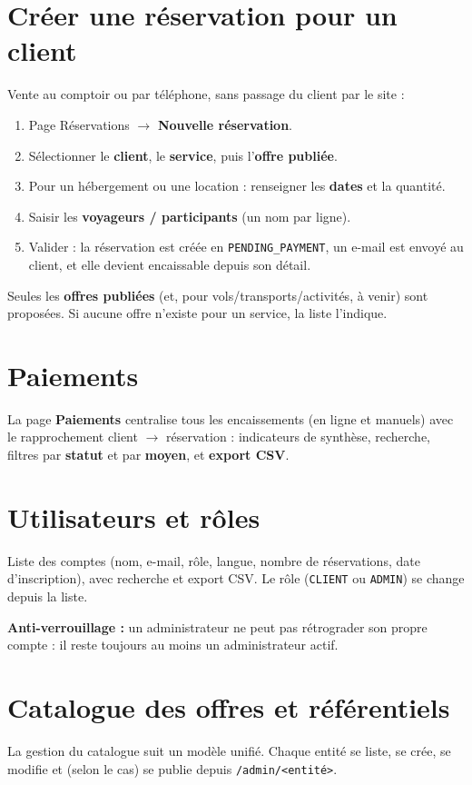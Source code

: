 \documentclass[11pt,a4paper]{article}
\newcommand{\etat}[1]{\textcolor{taNavy}{\texttt{#1}}}
\newcommand{\chemin}[1]{\textcolor{taStone}{\texttt{#1}}}
\begin{document}
\section{Créer une réservation pour un client}
Vente au comptoir ou par téléphone, sans passage du client par le site :
\begin{enumerate}[leftmargin=1.6em]
  \item Page Réservations $\rightarrow$ \textbf{Nouvelle réservation}.
  \item Sélectionner le \textbf{client}, le \textbf{service}, puis l'\textbf{offre publiée}.
  \item Pour un hébergement ou une location : renseigner les \textbf{dates} et la quantité.
  \item Saisir les \textbf{voyageurs / participants} (un nom par ligne).
  \item Valider : la réservation est créée en \etat{PENDING\_PAYMENT}, un e-mail est envoyé au
        client, et elle devient encaissable depuis son détail.
\end{enumerate}
\begin{attention}
Seules les \textbf{offres publiées} (et, pour vols/transports/activités, à venir) sont
proposées. Si aucune offre n'existe pour un service, la liste l'indique.
\end{attention}

\section{Paiements}
La page \textbf{Paiements} centralise tous les encaissements (en ligne et manuels) avec le
rapprochement client $\rightarrow$ réservation : indicateurs de synthèse, recherche, filtres par
\textbf{statut} et par \textbf{moyen}, et \textbf{export CSV}.

\section{Utilisateurs et rôles}
Liste des comptes (nom, e-mail, rôle, langue, nombre de réservations, date d'inscription), avec
recherche et export CSV. Le rôle (\etat{CLIENT} ou \etat{ADMIN}) se change depuis la liste.
\begin{attention}
\textbf{Anti-verrouillage :} un administrateur ne peut pas rétrograder son propre compte : il
reste toujours au moins un administrateur actif.
\end{attention}

\section{Catalogue des offres et référentiels}
La gestion du catalogue suit un modèle unifié. Chaque entité se liste, se crée, se modifie et
(selon le cas) se publie depuis \chemin{/admin/<entité>}.
\end{document}
